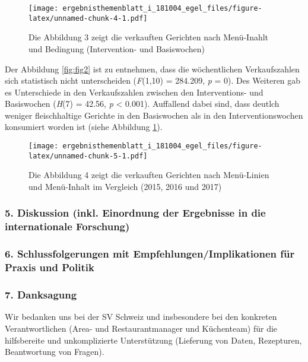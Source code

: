 \documentclass[12pt,ngerman,]{article}
\begin{document}
\begin{figure}
\centering
\texttt{[image: ergebnisthemenblatt\_i\_181004\_egel\_files/figure-latex/unnamed-chunk-4-1.pdf]}
\caption{\label{fig:fig3} Die Abbildung 3 zeigt die verkauften Gerichten
nach Menü-Inahlt und Bedingung (Intervention- und Basiswochen)}
\end{figure}

Der Abbildung \ref{fig:fig2} ist zu entnehmen, dass die wöchentlichen
Verkaufszahlen sich statistisch nicht unterscheiden (\emph{F}(1,10) =
284.209, \emph{p} = 0). Des Weiteren gab es Unterschiede in den
Verkaufszahlen zwischen den Interventions- und Basiswochen (\emph{H}(7)
= 42.56, \emph{p} \textless{} 0.001). Auffallend dabei sind, dass
deutlch weniger fleischhaltige Gerichte in den Basiswochen als in den
Interventionswochen konsumiert worden ist (siehe Abbildung
\ref{fig:fig3}).

\begin{figure}
\centering
\texttt{[image: ergebnisthemenblatt\_i\_181004\_egel\_files/figure-latex/unnamed-chunk-5-1.pdf]}
\caption{\label{fig:fig4} Die Abbildung 4 zeigt die verkauften Gerichten
nach Menü-Linien und Menü-Inhalt im Vergleich (2015, 2016 und 2017)}
\end{figure}

\hypertarget{diskussion-inkl.-einordnung-der-ergebnisse-in-die-internationale-forschung}{%
\subsubsection{5. Diskussion (inkl. Einordnung der Ergebnisse in die
internationale
Forschung)}\label{diskussion-inkl.-einordnung-der-ergebnisse-in-die-internationale-forschung}}

\hypertarget{schlussfolgerungen-mit-empfehlungenimplikationen-fur-praxis-und-politik}{%
\subsubsection{6. Schlussfolgerungen mit Empfehlungen/Implikationen für
Praxis und
Politik}\label{schlussfolgerungen-mit-empfehlungenimplikationen-fur-praxis-und-politik}}

\hypertarget{danksagung}{%
\subsubsection{7. Danksagung}\label{danksagung}}

Wir bedanken uns bei der SV Schweiz und insbesondere bei den konkreten
Verantwortlichen (Area- und Restaurantmanager und Küchenteam) für die
hilfsbereite und unkomplizierte Unterstützung (Lieferung von Daten,
Rezepturen, Beantwortung von Fragen).
\end{document}
